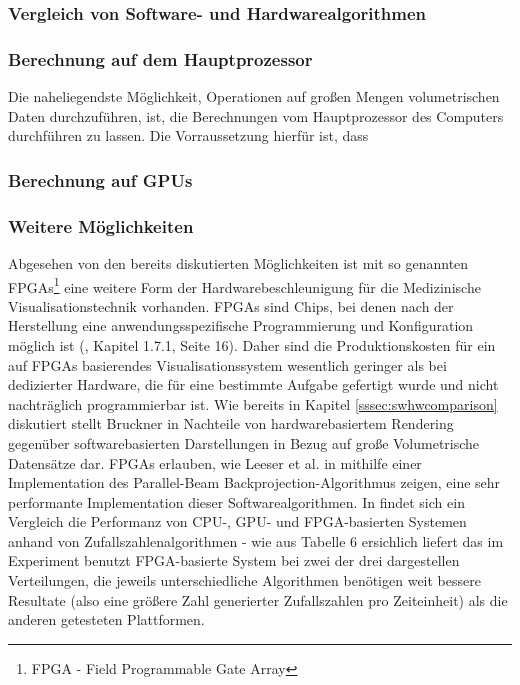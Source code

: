 \documentclass[a4paper]{scrartcl}
\begin{document}
\subsubsection{Vergleich von Software- und Hardwarealgorithmen}\label{ssec:swhwcomparison}
\subsubsection{Berechnung auf dem Hauptprozessor}\label{sssec:cpucalculation}
Die naheliegendste Möglichkeit, Operationen auf großen Mengen volumetrischen Daten durchzuführen, ist, die Berechnungen vom Hauptprozessor des Computers durchführen zu lassen. Die Vorraussetzung hierfür ist, dass 
\subsubsection{Berechnung auf GPUs}\label{sssec:gpucalculation}
\subsubsection{Weitere Möglichkeiten}
Abgesehen von den bereits diskutierten Möglichkeiten ist mit so genannten FPGAs\footnote{FPGA - Field Programmable Gate Array} eine weitere Form der Hardwarebeschleunigung für die Medizinische Visualisationstechnik vorhanden. FPGAs sind Chips, bei denen nach der Herstellung eine anwendungsspezifische Programmierung und Konfiguration möglich ist (\cite{Kibritev2009}, Kapitel 1.7.1, Seite 16). Daher sind die Produktionskosten für ein auf FPGAs basierendes Visualisationssystem wesentlich geringer als bei dedizierter Hardware, die für eine bestimmte Aufgabe gefertigt wurde und nicht nachträglich programmierbar ist. Wie bereits in Kapitel \vref{sssec:swhwcomparison} diskutiert stellt Bruckner in \cite{Bruckner08} Nachteile von hardwarebasiertem Rendering gegenüber softwarebasierten Darstellungen in Bezug auf große Volumetrische Datensätze dar. FPGAs erlauben, wie Leeser et al. in \cite{Leeser2005} mithilfe einer Implementation des Parallel-Beam Backprojection-Algorithmus zeigen, eine sehr performante Implementation dieser Softwarealgorithmen. In \cite{Thomas2009} findet sich ein Vergleich die Performanz von CPU-, GPU- und FPGA-basierten Systemen anhand von Zufallszahlenalgorithmen - wie aus Tabelle 6 ersichlich liefert das im Experiment benutzt FPGA-basierte System bei zwei der drei dargestellen Verteilungen, die jeweils unterschiedliche Algorithmen benötigen weit bessere Resultate (also eine größere Zahl generierter Zufallszahlen pro Zeiteinheit) als die anderen getesteten Plattformen.
\end{document}
